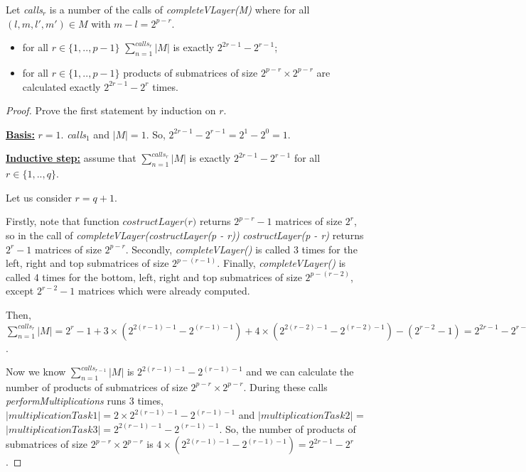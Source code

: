 \begin{lemma}
Let \textit{calls$_{r}$} is a number of the calls of \textit{completeVLayer(M)} where for all $(l, m, l', m') \in M$ with $m - l = 2^{p - r}$.
\begin{itemize}
 \item for all $r \in \{ 1, .., p - 1\}$  $\sum_{n=1}^{calls_r}{|M|}$ is exactly $2^{2r - 1} - 2^{r - 1}$;
 \item for all $r \in \{ 1, .., p - 1\}$ products of submatrices of size $2^{p - r} \times 2^{p - r}$ are calculated exactly $2^{2r - 1} - 2^{r}$ times.
\end{itemize}
\end{lemma}

\begin{proof}

Prove the first statement by induction on $r$.

\underline{\textbf{Basis:}} $r = 1$. \textit{calls$_{1}$} and $|M| = 1$. So, $2^{2r - 1} - 2^{r - 1} = 2^1 - 2^0 = 1$.

\underline{\textbf{Inductive step:}} assume that $\sum_{n=1}^{calls_r}{|M|}$ is exactly $2^{2r - 1} - 2^{r - 1}$ for all $r \in \{ 1, .., q\}$.

Let us consider $r = q + 1$.

Firstly, note that function $\textit{costructLayer(r)}$ returns $2^{p - r} - 1$ matrices of size $2^r$, so in the call of \textit{completeVLayer(costructLayer(p - r))}  \textit{costructLayer(p - r)} returns $2^r - 1$ matrices of size $2^{p - r}$. 
Secondly, \textit{completeVLayer()} is called 3 times for the left, right and top submatrices of size $2^{p - (r - 1)}$. Finally, \textit{completeVLayer()} is called 4 times for the bottom, left, right and top submatrices of size $2^{p - (r - 2)}$, except $2^{r - 2} - 1$ matrices which were already computed.

Then, $\sum_{n=1}^{calls_r}{|M|} = 2^{r} - 1 + 3 \times (2^{2(r - 1) - 1} - 2^{(r - 1) - 1}) + 4 \times (2^{2(r - 2) - 1} - 2^{(r - 2) - 1}) - (2^{r - 2} - 1) = 2^{2r - 1} - 2^{r - 1}$.

Now we know $\sum_{n=1}^{calls_{r-1}}{|M|}$  is $2^{2(r - 1) - 1} - 2^{(r - 1) - 1}$ and we can calculate the number of products of submatrices of size $2^{p - r} \times 2^{p - r}$. 
During these calls \textit{performMultiplications} runs 3 times, $|multiplicationTask1| = 2 \times 2^{2(r - 1) - 1} - 2^{(r - 1) - 1}$ and $|multiplicationTask2|$ = $|multiplicationTask3| = 2^{2(r - 1) - 1} - 2^{(r - 1) - 1}$. So, the number of products of submatrices of size $2^{p - r} \times 2^{p - r}$ is $ 4 \times (2^{2(r - 1) - 1} - 2^{(r - 1) - 1}) = 2^{2r - 1} - 2^{r}$.
\end{proof}

